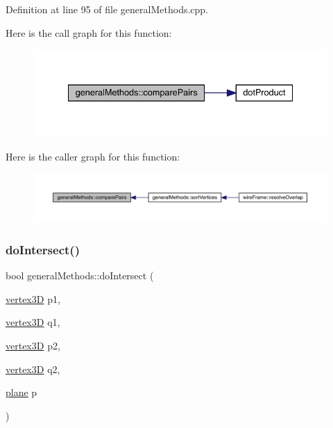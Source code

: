 Definition at line 95 of file general\+Methods.\+cpp.

Here is the call graph for this function\+:
\nopagebreak
\begin{figure}[H]
\begin{center}
\leavevmode
\includegraphics[width=335pt]{namespacegeneral_methods_afc8f20af710f8dc24af591015acc1403_cgraph}
\end{center}
\end{figure}
Here is the caller graph for this function\+:
\nopagebreak
\begin{figure}[H]
\begin{center}
\leavevmode
\includegraphics[width=350pt]{namespacegeneral_methods_afc8f20af710f8dc24af591015acc1403_icgraph}
\end{center}
\end{figure}
\mbox{\label{namespacegeneral_methods_a56efd049c58aae30a7b0caf39beab615}} 
\subsubsection{\texorpdfstring{do\+Intersect()}{doIntersect()}}
{\footnotesize\ttfamily bool general\+Methods\+::do\+Intersect (\begin{DoxyParamCaption}\item[{\mbox{\hyperlink{structvertex3_d}{vertex3D}}}]{p1,  }\item[{\mbox{\hyperlink{structvertex3_d}{vertex3D}}}]{q1,  }\item[{\mbox{\hyperlink{structvertex3_d}{vertex3D}}}]{p2,  }\item[{\mbox{\hyperlink{structvertex3_d}{vertex3D}}}]{q2,  }\item[{\mbox{\hyperlink{structplane}{plane}}}]{p }\end{DoxyParamCaption})}



